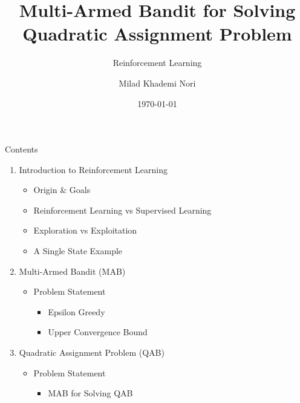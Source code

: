 \documentclass{beamer}
\title[Reinforcement Learning]{Multi-Armed Bandit for Solving Quadratic Assignment Problem}
\subtitle{Reinforcement Learning}
\author{Milad Khademi Nori}
\date{\today}
\begin{document}
\begin{frame}
\titlepage
\end{frame}


\begin{frame}[t]{Contents} %
\begin{enumerate}
\item Introduction to Reinforcement Learning
		\begin{itemize}
		\item Origin \& Goals		
		\item Reinforcement Learning vs Supervised Learning		
		\item Exploration vs Exploitation		
		\item A Single State Example
		\end{itemize}		
\item Multi-Armed Bandit (MAB)
		\begin{itemize}		
		\item Problem Statement
			\begin{itemize}
			\item Epsilon Greedy		
			\item Upper Convergence Bound
			\end{itemize}
		\end{itemize}		
\item Quadratic Assignment Problem (QAB)
		\begin{itemize}
		\item Problem Statement		
			\begin{itemize}		
			\item MAB for Solving QAB			
			\end{itemize}
		\end{itemize}
\end{enumerate}
\end{frame}
\end{document}
